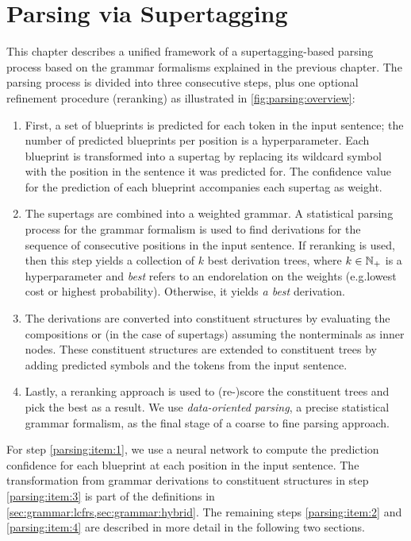 \documentclass[../document.tex]{subfiles}
\begin{document}
    \chapter{Parsing via Supertagging}
    This chapter describes a unified framework of a supertagging-based parsing process based on the grammar formalisms explained in the previous chapter.
    The parsing process is divided into three consecutive steps, plus one optional refinement procedure (reranking) as illustrated in \cref{fig:parsing:overview}:
    \begin{enumerate}
        \item\label{parsing:item:1}
            First, a set of blueprints is predicted for each token in the input sentence; the number of predicted blueprints per position is a hyperparameter.
            Each blueprint is transformed into a supertag by replacing its wildcard symbol with the position in the sentence it was predicted for.
            The confidence value for the prediction of each blueprint accompanies each supertag as weight.
        \item\label{parsing:item:2}
            The supertags are combined into a weighted grammar.
            A statistical parsing process for the grammar formalism is used to find derivations for the sequence of consecutive positions in the input sentence.
            If reranking is used, then this step yields a collection of \(k\) best derivation trees, where \(k \in \mathbb{N}_+\) is a hyperparameter and \emph{best} refers to an endorelation on the weights (e.g.\@ lowest cost or highest probability).
            Otherwise, it yields \emph{a best} derivation.
        \item\label{parsing:item:3}
            The derivations are converted into constituent structures by evaluating the  compositions or (in the case of  supertags) assuming the nonterminals as inner nodes.
            These constituent structures are extended to constituent trees by adding predicted  symbols and the tokens from the input sentence.
        \item\label{parsing:item:4}
            Lastly, a reranking approach is used to (re-)score the constituent trees and pick the best as a result.
            We use \emph{data-oriented parsing}, a precise statistical grammar formalism, as the final stage of a coarse to fine parsing approach. \citep{CraSchBod16}
    \end{enumerate}
    For step \ref{parsing:item:1}, we use a neural network to compute the prediction confidence for each blueprint at each position in the input sentence.
    The transformation from grammar derivations to constituent structures in step \ref{parsing:item:3} is part of the definitions in \cref{sec:grammar:lcfrs,sec:grammar:hybrid}.
    The remaining steps \ref{parsing:item:2} and \ref{parsing:item:4} are described in more detail in the following two sections.
\end{document}
